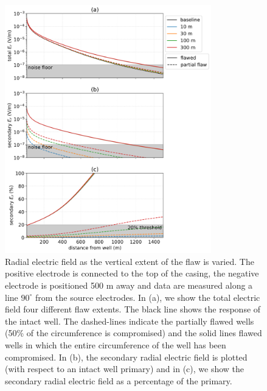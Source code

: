\begin{figure}
    \begin{center}
    \includegraphics[width=0.8\textwidth]{figures/dc_casing/integrity_partial_flaw.png}
    \end{center}
\caption{
    Radial electric field as the vertical extent of the flaw is varied.
    The positive electrode is connected to the top of the casing, the negative electrode
    is positioned 500 m away and data are measured along a line $90^\circ$ from the
    source electrodes. In (a), we show the total electric field four different flaw extents.
    The black line shows the response of the intact well.
    The dashed-lines indicate the partially flawed wells (50\% of the circumference is compromised)
    and the solid lines flawed wells in which the entire circumference of the well has been compromised.
    In (b), the secondary radial electric field is plotted (with respect to an intact well primary)
    and in (c), we show the secondary radial electric field as a percentage of the primary.
}
\label{fig:integrity_partial_flaw}
\end{figure}
